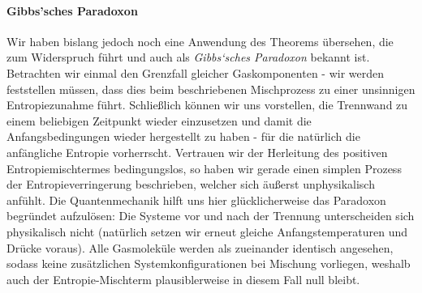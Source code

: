 \paragraph*{Gibbs'sches Paradoxon}
Wir haben bislang jedoch noch eine Anwendung des Theorems übersehen, die zum Widerspruch führt und auch als \emph{Gibbs‘sches Paradoxon} bekannt ist.
Betrachten wir einmal den Grenzfall gleicher Gaskomponenten - wir werden feststellen müssen, dass dies beim beschriebenen Mischprozess zu einer unsinnigen Entropiezunahme führt. Schließlich können wir uns vorstellen, die Trennwand zu einem beliebigen Zeitpunkt wieder einzusetzen und damit die Anfangsbedingungen wieder hergestellt zu haben - für die natürlich die anfängliche Entropie vorherrscht. Vertrauen wir der Herleitung des positiven Entropiemischtermes bedingungslos, so haben wir gerade einen simplen Prozess der Entropieverringerung beschrieben, welcher sich äußerst unphysikalisch anfühlt. Die Quantenmechanik hilft uns hier glücklicherweise das Paradoxon begründet aufzulösen: Die Systeme vor und nach der Trennung unterscheiden sich physikalisch nicht (natürlich setzen wir erneut gleiche Anfangstemperaturen und Drücke voraus). Alle Gasmoleküle werden als zueinander identisch angesehen, sodass keine zusätzlichen Systemkonfigurationen bei Mischung vorliegen, weshalb auch der Entropie-Mischterm plausiblerweise in diesem Fall null bleibt. 
	
